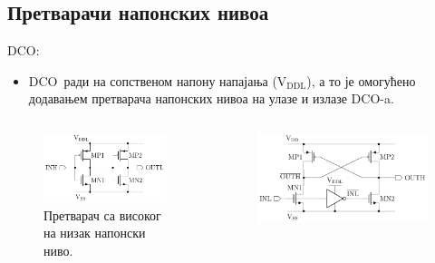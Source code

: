 \documentclass[aspectratio=169]{beamer}
\def \DCO  {DCO} %
\begin{document}
\subsection{Претварачи напонских нивоа}

\begin{frame}{\DCO: \subsecname}
    \begin{itemize}
        \item \DCO\ ради на сопственом напону напајања ($\text{V}_\text{DDL}$), а то је омогућено додавањем претварача напонских нивоа на улазе и излазе \DCO-a.
    \end{itemize}
    \vspace{-0.5cm}
    \begin{columns}[t]
        \begin{column}{0.5\textwidth}
            \begin{figure}[!h]
	    \medskip
            \centering
            \includegraphics[scale=0.65]{slike/prezentacija/Level_shifter_HL.pdf}
            \caption{Претварач са високог на низак напонски ниво.}
            \label{Level_shifter_HL}
            \end{figure}
		\end{column}
		\begin{column}{0.5\textwidth}
            \begin{figure}[!h]
                \centering
                \includegraphics[scale=0.65]{slike/prezentacija/Level_shifter_LH.pdf}

\end{figure}
\end{column}
\end{columns}
\end{frame}
\end{document}
